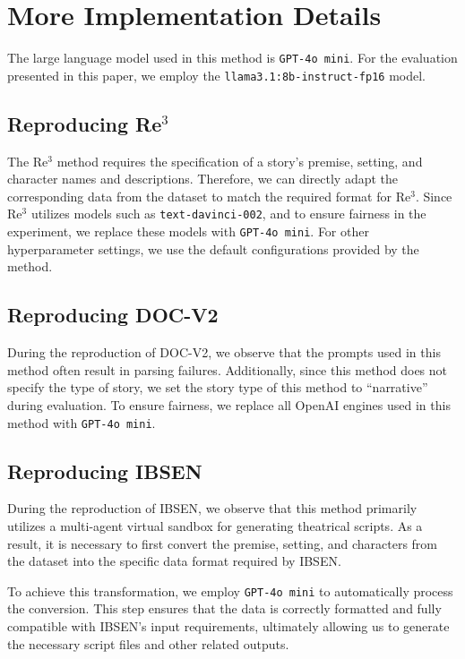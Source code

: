 \documentclass[letterpaper]{article} %
\begin{document}
\twocolumn

\section{More Implementation Details}
\label{sec:more_impl_details}

The large language model used in this method is \texttt{GPT-4o mini}. For the evaluation presented in this paper, we employ the \texttt{llama3.1:8b-instruct-fp16} model.

\subsection{Reproducing Re$^3$}

The Re$^3$ method requires the specification of a story's premise, setting, and character names and descriptions. Therefore, we can directly adapt the corresponding data from the dataset to match the required format for Re$^3$. Since Re$^3$ utilizes models such as \texttt{text-davinci-002}, and to ensure fairness in the experiment, we replace these models with \texttt{GPT-4o mini}. For other hyperparameter settings, we use the default configurations provided by the method.

\subsection{Reproducing DOC-V2}

During the reproduction of DOC-V2, we observe that the prompts used in this method often result in parsing failures. Additionally, since this method does not specify the type of story, we set the story type of this method to ``narrative'' during evaluation. To ensure fairness, we replace all OpenAI engines used in this method with \texttt{GPT-4o mini}.

\subsection{Reproducing IBSEN}

During the reproduction of IBSEN, we observe that this method primarily utilizes a multi-agent virtual sandbox for generating theatrical scripts. As a result, it is necessary to first convert the premise, setting, and characters from the dataset into the specific data format required by IBSEN.

To achieve this transformation, we employ \texttt{GPT-4o mini} to automatically process the conversion. This step ensures that the data is correctly formatted and fully compatible with IBSEN's input requirements, ultimately allowing us to generate the necessary script files and other related outputs.
\end{document}
